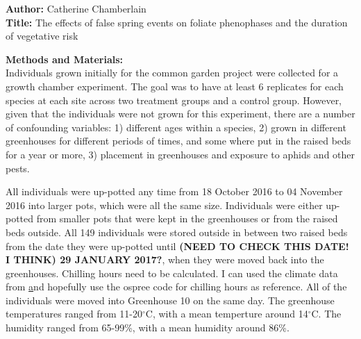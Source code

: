 \documentclass{article}\usepackage[]{graphicx}\usepackage[]{color}
\begin{document}
\renewcommand{\thetable}{\arabic{table}}
\renewcommand{\thefigure}{\arabic{figure}}
\renewcommand{\labelitemi}{$-$}

\textbf{Author:} Catherine Chamberlain \\
\textbf{Title:} The effects of false spring events on foliate phenophases and the duration of vegetative risk
\par

{\large\textbf{Methods and Materials:}}\\
Individuals grown initially for the common garden project were collected for a growth chamber experiment. The goal was to have at least 6 replicates for each species at each site across two treatment groups and a control group. However, given that the individuals were not grown for this experiment, there are a number of confounding variables: 1) different ages within a species, 2) grown in different greenhouses for different periods of times, and some where put in the raised beds for a year or more, 3) placement in greenhouses and exposure to aphids and other pests. 

All individuals were up-potted any time from 18 October 2016 to 04 November 2016 into larger pots, which were all the same size. Individuals were either up-potted from smaller pots that were kept in the greenhouses or from the raised beds outside. All 149 individuals were stored outside in between two raised beds from the date they were up-potted until {\textbf{(NEED TO CHECK THIS DATE! I THINK) 29 JANUARY 2017?}}, when they were moved back into the greenhouses. Chilling hours need to be calculated. I can used the climate data from \href{http://labs.arboretum.harvard.edu/weather/} and hopefully use the ospree code for chilling hours as reference. All of the individuals were moved into Greenhouse 10 on the same day. The greenhouse temperatures ranged from 11-20$^{\circ}$C, with a mean temperture around 14$^{\circ}$C. The humidity ranged from 65-99\%, with a mean humidity around 86\%.
\end{document}
